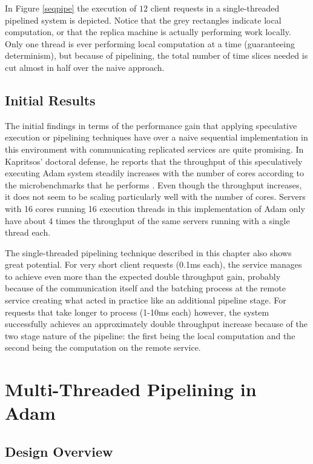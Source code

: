 \documentclass[11pt, oneside]{report}
\begin{document}
In Figure \ref{seqpipe} the execution of $12$ client requests in a single-threaded pipelined system is depicted. 
Notice that the grey rectangles indicate local computation, or that the replica machine is actually performing work locally. 
Only one thread is ever performing local computation at a time (guaranteeing determinism), but because of pipelining, the total number of time slices needed is cut almost in half over the naive approach.

\section{Initial Results}

The initial findings in terms of the performance gain that applying speculative execution or pipelining techniques have over a naive sequential implementation in this environment with communicating replicated services are quite promising. 
In Kapritsos' doctoral defense, he reports that the throughput of this speculatively executing Adam system steadily increases with the number of cores according to the microbenchmarks that he performs \cite{manosThesis}. 
Even though the throughput increases, it does not seem to be scaling particularly well with the number of cores. 
Servers with 16 cores running 16 execution threads in this implementation of Adam only have about 4 times the throughput of the same servers running with a single thread each.

The single-threaded pipelining technique described in this chapter also shows great potential. 
For very short client requests (0.1ms each), the service manages to achieve even more than the expected double throughput gain, probably because of the communication itself and the batching process at the remote service creating what acted in practice like an additional pipeline stage. 
For requests that take longer to process (1-10ms each) however, the system successfully achieves an approximately double throughput increase because of the two stage nature of the pipeline: the first being the local computation and the second being the computation on the remote service.

\chapter{Multi-Threaded Pipelining in Adam}\label{AdamDesign}

\section{Design Overview}
\end{document}
